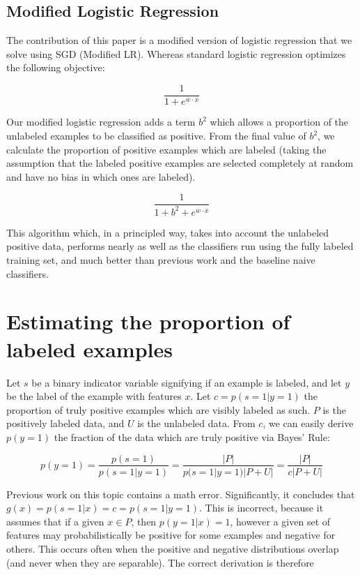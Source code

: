 \documentclass{article}
\begin{document}
\subsection{Modified Logistic Regression}
The contribution of this paper is a modified version of logistic regression that we solve using SGD (Modified LR).  Whereas standard logistic regression optimizes the following objective:

$$ \frac{1}{1 + e^{\overline{w} \cdot \overline{x}}} $$

Our modified logistic regression adds a term $b^2$ which allows a proportion of the unlabeled examples to be classified as positive. From the final value of $b^2$, we calculate the proportion of positive examples which are labeled (taking the assumption that the labeled positive examples are selected completely at random and have no bias in which ones are labeled).

$$ \frac{1}{1 + b^2 + e^{\overline{w} \cdot \overline{x}}} $$

This algorithm which, in a principled way, takes into account the unlabeled positive data, performs nearly as well as the classifiers run using the fully labeled training set, and much better than previous work and the baseline naive classifiers.


\section{Estimating the proportion of labeled examples}
Let $s$ be a binary indicator variable signifying if an example is labeled, and let $y$ be the label of the example with features $x$. Let $c = p(s=1|y=1)$ the proportion of truly positive examples which are visibly labeled as such. $P$ is the positively labeled data, and $U$ is the unlabeled data. From $c$, we can easily derive $p(y=1)$ the fraction of the data which are truly positive via Bayes' Rule:

$$ p(y=1) = \frac{p(s=1)}{p(s = 1|y = 1)} =  \frac{|P|}{p(s = 1|y = 1)|P+U|} = \frac{|P|}{c|P+U|} $$

Previous work on this topic\cite{elkan08} contains a math error.  Significantly, it concludes that $g(x) = p(s=1|x) = c = p(s=1|y=1)$. This is incorrect, because it assumes that if a given $x \in P$, then $p(y=1|x) = 1$, however a given set of features may probabilistically be positive for some examples and negative for others. This occurs often when the positive and negative distributions overlap (and never when they are separable). The correct derivation is therefore
\end{document}
